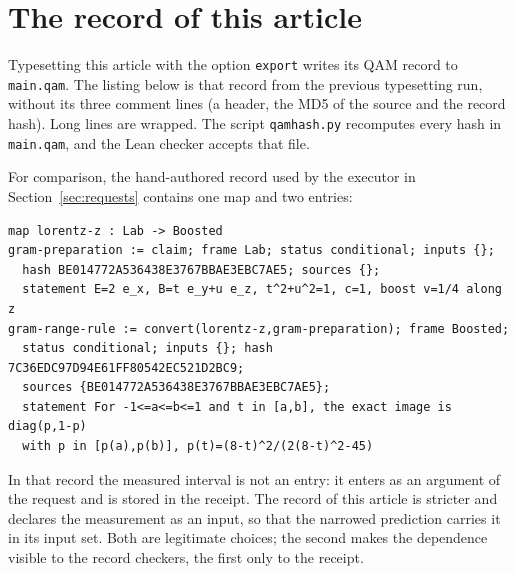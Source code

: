 \section{The record of this article}\label{app:record}

Typesetting this article with the option \texttt{export} writes its QAM record to \texttt{main.qam}. The listing below is that record from
the previous typesetting run, without its three comment lines (a header, the MD5 of the source and the record hash). Long lines are
wrapped. The script \texttt{qamhash.py} recomputes every hash in \texttt{main.qam}, and the Lean checker accepts that file.

{\footnotesize
{}
  {}
  {}
}

For comparison, the hand-authored record used by the executor in Section~\ref{sec:requests} contains one map and two entries:
\begin{lstlisting}[basicstyle=\ttfamily\scriptsize]
map lorentz-z : Lab -> Boosted
gram-preparation := claim; frame Lab; status conditional; inputs {};
  hash BE014772A536438E3767BBAE3EBC7AE5; sources {};
  statement E=2 e_x, B=t e_y+u e_z, t^2+u^2=1, c=1, boost v=1/4 along z
gram-range-rule := convert(lorentz-z,gram-preparation); frame Boosted;
  status conditional; inputs {}; hash 7C36EDC97D94E61FF80542EC521D2BC9;
  sources {BE014772A536438E3767BBAE3EBC7AE5};
  statement For -1<=a<=b<=1 and t in [a,b], the exact image is diag(p,1-p)
  with p in [p(a),p(b)], p(t)=(8-t)^2/(2(8-t)^2-45)
\end{lstlisting}
In that record the measured interval is not an entry: it enters as an argument of the request and is stored in the receipt. The record
of this article is stricter and declares the measurement as an input, so that the narrowed prediction carries it in its input set. Both
are legitimate choices; the second makes the dependence visible to the record checkers, the first only to the receipt.
